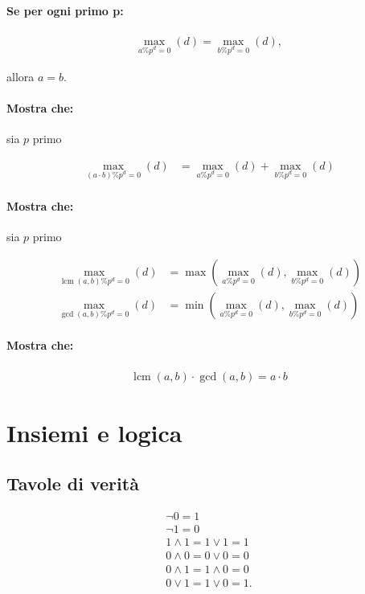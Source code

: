 \documentclass{article}
\begin{document}
\paragraph{Se per ogni primo p:}

\begin{align*}
\max_{a \% p^d = 0}(d) = \max_{b \% p^d = 0}(d),
\end{align*}

allora $a = b$.

\paragraph{Mostra che:} sia $p$ primo

\begin{align*}
\max_{(a \cdot b) \% p^d = 0}(d) &= \max_{a \% p^d = 0}(d) + \max_{b \% p^d = 0}(d)
\end{align*}

\paragraph{Mostra che:} sia $p$ primo

\begin{align*}
\max_{\operatorname{lcm}(a, b) \% p^d = 0}(d) &= \max\left(\max_{a \% p^d = 0}(d), \max_{b \% p^d = 0}(d)\right)\\
\max_{\operatorname{gcd}(a, b) \% p^d = 0}(d) &= \min\left(\max_{a \% p^d = 0}(d), \max_{b \% p^d = 0}(d)\right)
\end{align*}

\paragraph{Mostra che:}

\begin{align*}
\operatorname{lcm}(a, b) \cdot \operatorname{gcd}(a, b) = a \cdot b
\end{align*}

\newpage
\section*{Insiemi e logica}

\subsection*{Tavole di verità}

\begin{align*}
\lnot 0 = 1\\
\lnot 1 = 0\\
1 \land 1 = 1 \lor 1 = 1\\
0 \land 0 = 0 \lor 0 = 0\\
0 \land 1 = 1 \land 0 = 0\\
0 \lor 1 = 1 \lor 0 = 1.
\end{align*}
\end{document}
